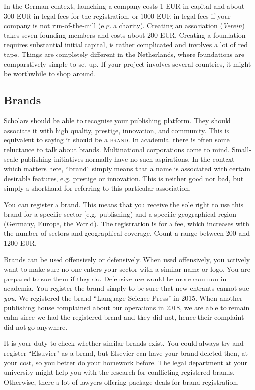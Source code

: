\documentclass[nonflat,modfonts,output=book] {langsci/langscibook}
\begin{document}
In the German context, launching a company costs 1 EUR in capital and about 300 EUR in legal fees for the registration, or 1000 EUR in legal fees if your company is not run-of-the-mill (e.g. a charity). Creating an association (\textit{Verein}) takes seven founding members and costs about 200 EUR. 
Creating a foundation requires substantial initial capital, is rather complicated and involves a lot of red tape. Things are completely different in the Netherlands, where foundations are comparatively simple to set up. If your project involves several countries, it might be worthwhile to shop around. 

\subsection{Brands}\label{sec:legal:brand}
Scholars should be able to recognise your publishing platform. They should associate it with high quality, prestige, innovation, and community. This is equivalent to saying it should be a \textsc{brand}. In academia, there is often some reluctance to talk about brands. Multinational corporations come to mind. Small-scale publishing initiatives normally have no such aspirations. In the context which matters here, ``brand'' simply means that a name is associated with certain desirable features, e.g. prestige or innovation. This is neither good nor bad, but simply a shorthand for referring to this particular association. 

You can register a brand. This means that you receive the sole right to use this brand for a specific sector (e.g. publishing) and a specific geographical region (Germany, Europe, the World). The registration is for a fee, which increases with the number of sectors and geographical coverage. Count a range between 200 and 1200 EUR. 

Brands can be used offensively or defensively. When used offensively, you actively want to make sure no one enters your sector with a similar name or logo. You are prepared to sue them if they do. Defensive use would be more common in academia. You register the brand simply to be sure that new entrants cannot sue \textit{you}. We registered the brand ``Language Science Press'' in 2015. When another publishing house complained about our operations in 2018, we are able to remain calm since we had the registered brand and they did not, hence their complaint did not go anywhere.

It is your duty to check whether similar brands exist. You could always try and register ``Elsuvier'' as a brand, but Elsevier can have your brand deleted then, at your cost, so you better do your homework before. The legal department at your university might help you with the research for conflicting registered brands. Otherwise, there a lot of lawyers offering package deals for brand registration. 
\end{document}
